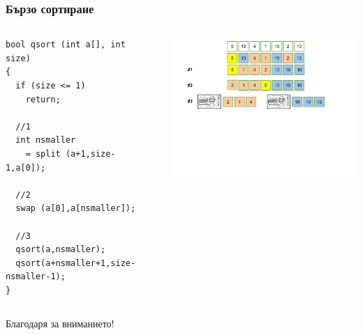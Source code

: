 \documentclass{beamer}
\begin{document}
\begin{frame}[fragile]
\frametitle{Бързо сортиране}



\begin{columns}[t]
  \begin{column}{0.5\textwidth}

\begin{lstlisting}
bool qsort (int a[], int size)
{
  if (size <= 1)
    return;

  //1
  int nsmaller
    = split (a+1,size-1,a[0]);

  //2
  swap (a[0],a[nsmaller]);

  //3
  qsort(a,nsmaller);
  qsort(a+nsmaller+1,size-nsmaller-1);
}
\end{lstlisting}


  \end{column}
  \begin{column}{0.5\textwidth}
\vspace*{-1pt}
\hspace*{-50pt}
\includegraphics[width=9cm]{images/qsort}

  \end{column}
\end{columns}



\end{frame}



\begin{frame}
\centerline{Благодаря за вниманието!}
\end{frame}
\end{document}
